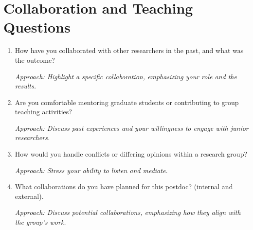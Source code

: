 \documentclass[12pt]{article}
\numberwithin{equation}{section}
\begin{document}
\section{Collaboration and Teaching Questions}
\begin{enumerate}
    \item How have you collaborated with other researchers in the past, and what was the outcome?
    
    \textit{Approach: Highlight a specific collaboration, emphasizing your role and the results.}

    \item Are you comfortable mentoring graduate students or contributing to group teaching activities?
    
    \textit{Approach: Discuss past experiences and your willingness to engage with junior researchers.}

    \item How would you handle conflicts or differing opinions within a research group?
    
    \textit{Approach: Stress your ability to listen and mediate.}

    \item What collaborations do you have planned for this postdoc? (internal and external).
    
    \textit{Approach: Discuss potential collaborations, emphasizing how they align with the group’s work.}
\end{enumerate}
\end{document}
